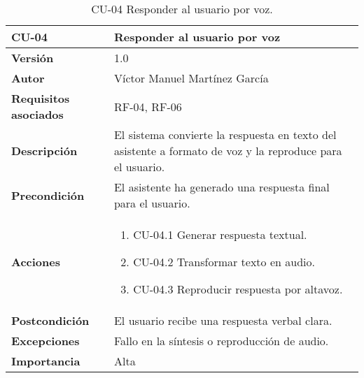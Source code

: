 \begin{table}[p]
    \centering
    \begin{tabularx}{\linewidth}{ p{} p{} }
        \toprule
        \textbf{CU-04}    & \textbf{Responder al usuario por voz}\\
        \toprule
        \textbf{Versión}              & 1.0 \\
        \textbf{Autor}                & Víctor Manuel Martínez García \\
        \textbf{Requisitos asociados} & RF-04, RF-06 \\
        \textbf{Descripción}          & El sistema convierte la respuesta en texto del asistente a formato de voz y la reproduce para el usuario.\\
        \textbf{Precondición}         & El asistente ha generado una respuesta final para el usuario.\\
        \textbf{Acciones}             &
        \begin{enumerate}
          \item CU-04.1 Generar respuesta textual.
          \item CU-04.2 Transformar texto en audio.
          \item CU-04.3 Reproducir respuesta por altavoz.
        \end{enumerate}\\
        \textbf{Postcondición}        & El usuario recibe una respuesta verbal clara.\\
        \textbf{Excepciones}          & Fallo en la síntesis o reproducción de audio.\\
        \textbf{Importancia}          & Alta \\
        \bottomrule
    \end{tabularx}
    \caption{CU-04 Responder al usuario por voz.}
    \label{CU-04 Responder al usuario por voz}
\end{table}


